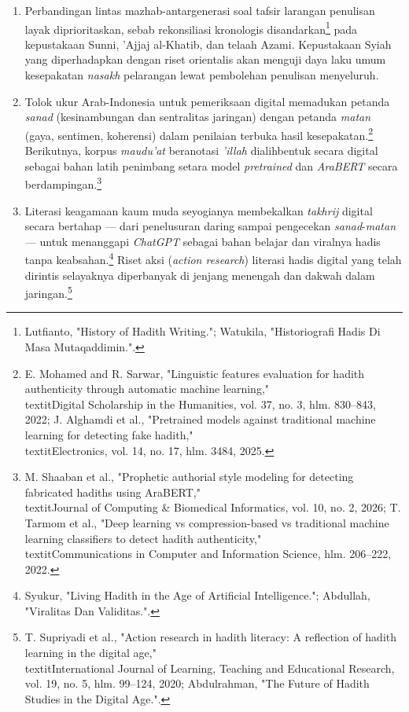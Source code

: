 \begin{enumerate}[leftmargin=1.27cm,itemsep=2pt,parsep=2pt]
\item Perbandingan lintas mazhab-antargenerasi soal tafsir larangan penulisan layak diprioritaskan, sebab rekonsiliasi kronologis disandarkan\footnote{Lutfianto, "History of Hadith Writing."; Watukila, "Historiografi Hadis Di Masa Mutaqaddimin.".} pada kepustakaan Sunni, 'Ajjaj al-Khatib, dan telaah Azami. Kepustakaan Syiah yang diperhadapkan dengan riset orientalis akan menguji daya laku umum kesepakatan \textit{nasakh} pelarangan lewat pembolehan penulisan menyeluruh.

\item Tolok ukur Arab-Indonesia untuk pemeriksaan digital memadukan petanda \textit{sanad} (kesinambungan dan sentralitas jaringan) dengan petanda \textit{matan} (gaya, sentimen, koherensi) dalam penilaian terbuka hasil kesepakatan.\footnote{E. Mohamed and R. Sarwar, "Linguistic features evaluation for hadith authenticity through automatic machine learning," \\textit{Digital Scholarship in the Humanities}, vol. 37, no. 3, hlm. 830--843, 2022; J. Alghamdi et al., "Pretrained models against traditional machine learning for detecting fake hadith," \\textit{Electronics}, vol. 14, no. 17, hlm. 3484, 2025.} Berikutnya, korpus \textit{maudu'at} beranotasi \textit{'illah} dialihbentuk secara digital sebagai bahan latih penimbang setara model \textit{pretrained} dan \textit{AraBERT} secara berdampingan.\footnote{M. Shaaban et al., "Prophetic authorial style modeling for detecting fabricated hadiths using AraBERT," \\textit{Journal of Computing \& Biomedical Informatics}, vol. 10, no. 2, 2026; T. Tarmom et al., "Deep learning vs compression-based vs traditional machine learning classifiers to detect hadith authenticity," \\textit{Communications in Computer and Information Science}, hlm. 206--222, 2022.}

\item Literasi keagamaan kaum muda seyogianya membekalkan \textit{takhrij} digital secara bertahap --- dari penelusuran daring sampai pengecekan \textit{sanad}-\textit{matan} --- untuk menanggapi \textit{ChatGPT} sebagai bahan belajar dan viralnya hadis tanpa keabsahan.\footnote{Syukur, "Living Hadith in the Age of Artificial Intelligence."; Abdullah, "Viralitas Dan Validitas.".} Riset aksi (\textit{action research}) literasi hadis digital yang telah dirintis selayaknya diperbanyak di jenjang menengah dan dakwah dalam jaringan.\footnote{T. Supriyadi et al., "Action research in hadith literacy: A reflection of hadith learning in the digital age," \\textit{International Journal of Learning, Teaching and Educational Research}, vol. 19, no. 5, hlm. 99--124, 2020; Abdulrahman, "The Future of Hadith Studies in the Digital Age.".}


\end{enumerate}

